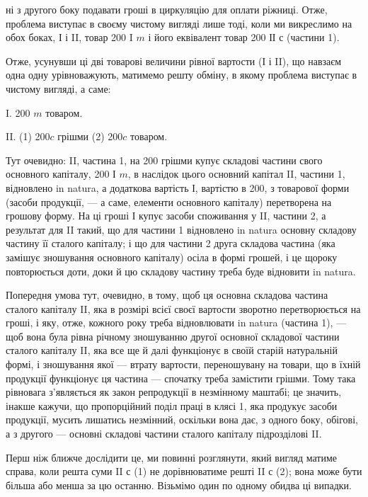 \parcont{}  %
ні з другого боку подавати гроші в циркуляцію для оплати ріжниці.
Отже, проблема виступає в своєму чистому вигляді лише тоді, коли ми
викреслимо на обох боках, І і II, товар 200 I $m$ і його еквівалент товар
200 ІІ $с$ (частини 1).

Отже, усунувши ці дві товарові величини рівної вартости (І і II),
що навзаєм одна одну урівноважують, матимемо решту обміну, в якому
проблема виступає в чистому вигляді, а саме:

I. 200 $m$ товаром.

II. (1) 200$c$ грішми \dplus{} (2) 200$c$ товаром.

Тут очевидно: II, частина 1, на 200 грішми купує складові частини
свого основного капіталу, 200 І $m$, в наслідок цього основний капітал II,
частини 1, відновлено in natura, а додаткова вартість І, вартістю в 200,
з товарової форми (засоби продукції, — а саме, елементи основного
капіталу) перетворена на грошову форму. На ці гроші І купує засоби
споживання у II, частини 2, а результат для II такий, що для частини 1
відновлено in natura основну складову частину її сталого капіталу; і що
для частини 2 друга складова частина (яка замішує зношування основного
капіталу) осіла в формі грошей, і це щороку повторюється доти,
доки й цю складову частину треба буде відновити in natura.

Попередня умова тут, очевидно, в тому, щоб ця основна складова частина
сталого капіталу II, яка в розмірі всієї своєї вартости зворотно перетворюється
на гроші, і яку, отже, кожного року треба відновлювати in natura
(частина 1), — щоб вона була рівна річному зношуванню другої основної
складової частини сталого капіталу II, яка все ще й далі функціонує в
своїй старій натуральній формі, і зношування якої — втрату вартости,
переношувану на товари, що в їхній продукції функціонує ця частина —
спочатку треба замістити грішми. Тому така рівновага з’являється як
закон репродукції в незмінному маштабі; це значить, інакше кажучи, що
пропорційний поділ праці в клясі 1, яка продукує засоби продукції,
мусить лишатись незмінний, оскільки вона дає, з одного боку, обігові,
а з другого — основні складові частини сталого капіталу підрозділові II.

Перш ніж ближче дослідити це, ми повинні розглянути, який вигляд
матиме справа, коли решта суми II $с$ (1) не дорівнюватиме решті II $с$
(2); вона може бути більша або менша за цю останню. Візьмімо один
по одному обидва ці випадки.

